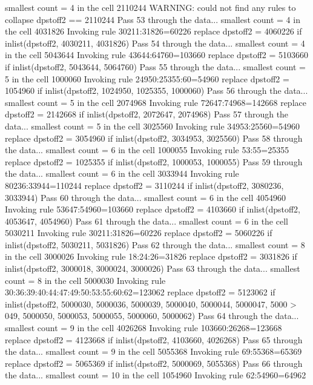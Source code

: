   smallest count = 4 in the cell      2110244
  WARNING: could not find any rules to collapse dpstoff2 == 2110244
Pass 53 through the data...
  smallest count = 4 in the cell      4031826
  Invoking rule 30211:31826=60226
  replace dpstoff2 = 4060226 if inlist(dpstoff2, 4030211, 4031826)
Pass 54 through the data...
  smallest count = 4 in the cell      5043644
  Invoking rule 43644:64760=103660
  replace dpstoff2 = 5103660 if inlist(dpstoff2, 5043644, 5064760)
Pass 55 through the data...
  smallest count = 5 in the cell      1000060
  Invoking rule 24950:25355:60=54960
  replace dpstoff2 = 1054960 if inlist(dpstoff2, 1024950, 1025355, 1000060)
Pass 56 through the data...
  smallest count = 5 in the cell      2074968
  Invoking rule 72647:74968=142668
  replace dpstoff2 = 2142668 if inlist(dpstoff2, 2072647, 2074968)
Pass 57 through the data...
  smallest count = 5 in the cell      3025560
  Invoking rule 34953:25560=54960
  replace dpstoff2 = 3054960 if inlist(dpstoff2, 3034953, 3025560)
Pass 58 through the data...
  smallest count = 6 in the cell      1000055
  Invoking rule 53:55=25355
  replace dpstoff2 = 1025355 if inlist(dpstoff2, 1000053, 1000055)
Pass 59 through the data...
  smallest count = 6 in the cell      3033944
  Invoking rule 80236:33944=110244
  replace dpstoff2 = 3110244 if inlist(dpstoff2, 3080236, 3033944)
Pass 60 through the data...
  smallest count = 6 in the cell      4054960
  Invoking rule 53647:54960=103660
  replace dpstoff2 = 4103660 if inlist(dpstoff2, 4053647, 4054960)
Pass 61 through the data...
  smallest count = 6 in the cell      5030211
  Invoking rule 30211:31826=60226
  replace dpstoff2 = 5060226 if inlist(dpstoff2, 5030211, 5031826)
Pass 62 through the data...
  smallest count = 8 in the cell      3000026
  Invoking rule 18:24:26=31826
  replace dpstoff2 = 3031826 if inlist(dpstoff2, 3000018, 3000024, 3000026)
Pass 63 through the data...
  smallest count = 8 in the cell      5000030
  Invoking rule 30:36:39:40:44:47:49:50:53:55:60:62=123062
  replace dpstoff2 = 5123062 if inlist(dpstoff2, 5000030, 5000036, 5000039, 5000040, 5000044, 5000047, 5000
> 049, 5000050, 5000053, 5000055, 5000060, 5000062)
Pass 64 through the data...
  smallest count = 9 in the cell      4026268
  Invoking rule 103660:26268=123668
  replace dpstoff2 = 4123668 if inlist(dpstoff2, 4103660, 4026268)
Pass 65 through the data...
  smallest count = 9 in the cell      5055368
  Invoking rule 69:55368=65369
  replace dpstoff2 = 5065369 if inlist(dpstoff2, 5000069, 5055368)
Pass 66 through the data...
  smallest count = 10 in the cell      1054960
  Invoking rule 62:54960=64962
